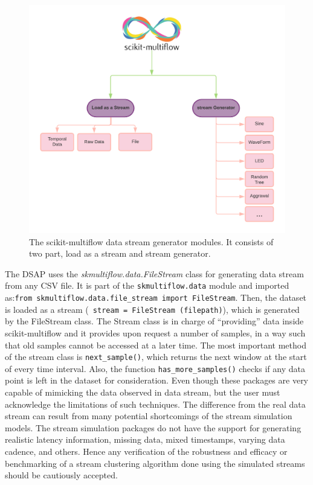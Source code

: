 \begin{figure}
    \centering
    \includegraphics[width = 11 cm]{image/Chapters/Chapter5/multiflow.png}
    \caption{The scikit-multiflow data stream generator modules. It consists of two part, load as a stream and stream generator.}
    \label{sci}
    \end{figure}

The DSAP uses the \textit{skmultiflow.data.FileStream} class for generating data stream from any CSV file. It is part of the \texttt{skmultiflow.data} module and imported as:\texttt{from skmultiflow.data.file\_stream import FileStream}. Then, the dataset is loaded as a stream (\texttt{ stream = FileStream (filepath)}), which is generated by the FileStream class. The Stream class is in charge of “providing” data inside scikit-multiflow and it provides upon request a number of samples, in a way such that old samples cannot be accessed at a later time. The most important method of the stream class is \texttt{next\_sample()}, which returns the next window at the start of every time interval. Also, the function \texttt{has\_more\_samples()} checks if any data point is left in the dataset for consideration. Even though these packages are very capable of mimicking the data observed in data stream, but the user must acknowledge the limitations of such techniques. The difference from the real data stream can result from many potential shortcomings of the stream simulation models. The stream simulation packages do not have the support for generating realistic latency information, missing data, mixed timestamps, varying data cadence, and others. Hence any verification of the robustness and efficacy or benchmarking of a stream clustering algorithm done using the simulated streams should be cautiously accepted. 


